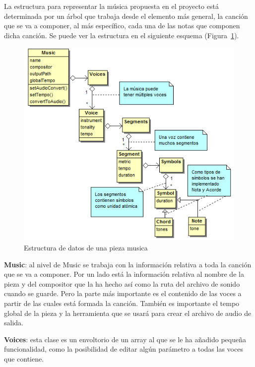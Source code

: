 
La estructura para representar la música propuesta en el proyecto está determinada por un árbol que trabaja desde el elemento más general, la canción que se va a componer, al más específico, cada una de las notas que componen dicha canción. Se puede ver la estructura en el siguiente esquema (Figura~\ref{fig:structmusic}).\\
	
	\begin{figure}[htbp]
	\centering
	\hspace*{-0.1in}
	\includegraphics[scale=0.6]{graphics/musica-estructura.png}
	\caption{Estructura de datos de una pieza musica}
	\label{fig:structmusic}
	\end{figure}


\textbf{Music}: al nivel de Music se trabaja con la información relativa a toda la canción que se va a componer. Por un lado está la información relativa al nombre de la pieza y del compositor que la ha hecho así como la ruta del archivo de sonido cuando se guarde. Pero la parte más importante es el contenido de las voces a partir de las cuales está formada la canción. También es importante el tempo global de la pieza y la herramienta que se usará para crear el archivo de audio de salida.
\newline

\textbf{Voices}: esta clase es un envoltorio de un array al que se le ha añadido pequeña funcionalidad, como la posibilidad de editar algún parámetro a todas las voces que contiene.
\newline

